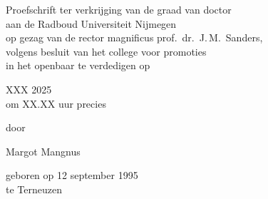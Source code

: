\begin{titlepage}
\begin{center}
    \makeatother%
    \vspace*{1em}
    Proefschrift ter verkrijging van de graad van doctor\\
    aan de Radboud Universiteit Nijmegen\\
    op gezag van de rector magnificus prof.~dr.~J.\,M.~Sanders,\\
    volgens besluit van het college voor promoties\\
    in het openbaar te verdedigen op

    \vspace*{1em}

    XXX 2025\\
    om XX.XX uur precies

    \vspace*{1em}

    door

    \vspace*{1em}

    Margot Mangnus

    \vspace*{1em}

    geboren op 12 september 1995\\
    te Terneuzen%
    \vspace*{\fill}

\end{center}
\end{titlepage}

